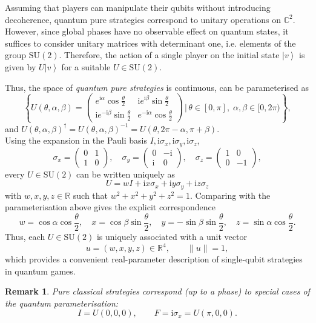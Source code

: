 \documentclass[11pt,a4paper,twoside]{article}
\newcommand{\SU}{\mathrm{SU}}
\newcommand{\mi}{\mathrm{i}} %
\newcommand{\ket}[1]{\left| #1 \right\rangle} %
\newtheorem{rem}[definition]{Remark}
\newenvironment{remark}{\begin{rem}  \rm }{\end{rem}}
\begin{document}
Assuming that players can manipulate their qubits without introducing decoherence, quantum pure strategies correspond to unitary operations on $\mathbb{C}^2$. However, since global phases have no observable effect on quantum states, it suffices to consider unitary matrices with determinant one, i.e. elements of the group $\SU(2)$.
Therefore, the action of a single player on the initial state $\ket{v}$ is given by $U\ket{v}$ for a suitable $U\in\SU(2)$.

Thus, the space of \emph{quantum pure strategies} is continuous, can be parameterised as
\[\left\{
U(\theta,\alpha,\beta)=
\begin{pmatrix}
e^{\mi\alpha}\cos\frac\theta2 & \mi e^{\mi\beta}\sin\frac\theta2\\
\mi e^{-\mi\beta}\sin\frac\theta2 & e^{-\mi\alpha}\cos\frac\theta2
\end{pmatrix}\,|\, \theta\in[0,\pi],\; \alpha,\beta\in[0,2\pi)\right\},
\]
and $U(\theta,\alpha,\beta)^\dagger=U(\theta,\alpha,\beta)^{-1}=U(\theta,2\pi-\alpha,\pi+\beta)$.\\

Using the expansion in the Pauli basis $I,\mi\sigma_x,\mi\sigma_y,\mi\sigma_z$, 
$$\sigma_x=\left(\begin{array}{cc}
0&1\\
1&0
\end{array}\right),\quad \sigma_y=\left(\begin{array}{cc}
0&-\mi\\
\mi&0
\end{array}\right),\quad \sigma_z=\left(\begin{array}{cc}
1&0\\
0&-1
\end{array}\right),$$
every $U\in\SU(2)$ can be written uniquely as
\[
U = w I + \mi x \sigma_x + \mi y \sigma_y + \mi z \sigma_z
\]
with $w,x,y,z\in\mathbb{R}$ such that $w^2+x^2+y^2+z^2=1$.
Comparing with the parameterisation above gives the explicit correspondence
\[
w = \cos\alpha\cos\frac\theta2,\quad
x = \cos\beta\sin\frac\theta2,\quad
y = -\sin\beta\sin\frac\theta2,\quad
z = \sin\alpha\cos\frac\theta2.
\]
Thus, each $U\in\SU(2)$ is uniquely associated with a unit vector
\[
u = (w,x,y,z) \in \mathbb{R}^4,
\qquad \|u\|=1,
\]
which provides a convenient real-parameter description of single-qubit strategies in quantum games.

\medskip

\begin{remark}
\rm    
Pure classical strategies correspond (up to a phase) to special cases of the quantum parameterisation:
\[
I = U(0,0,0), \qquad F = \mi\sigma_x = U(\pi,0,0).
\]
\end{remark} 
\end{document}
